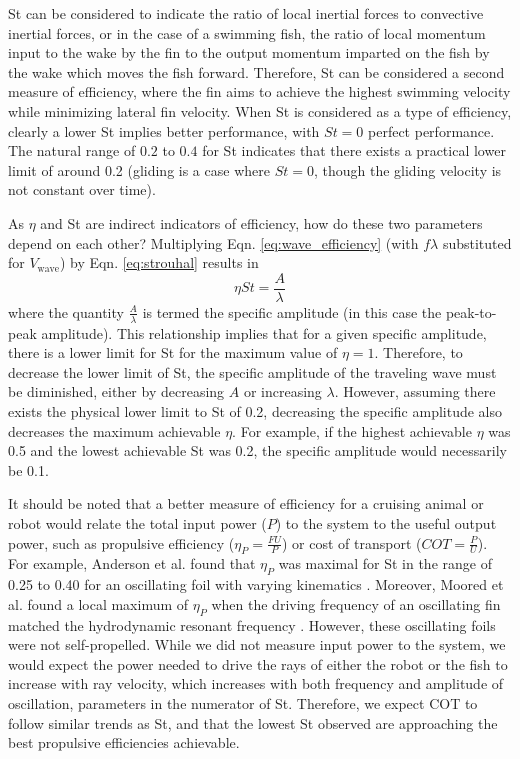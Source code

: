 \documentclass[onecolumn]{IEEEtran}
\begin{document}
St can be considered to indicate the ratio of local inertial forces to
convective inertial forces, or in the case of a swimming fish, the ratio
of local momentum input to the wake by the fin to the output momentum
imparted on the fish by the wake which moves the fish forward. Therefore,
St can be considered a second measure of efficiency, where the fin aims to
achieve the highest swimming velocity while minimizing lateral
fin velocity. When St is considered as a type of efficiency, clearly a
lower St implies better performance, with $St = 0$ perfect performance.
The natural range of $0.2$ to $0.4$ for St indicates that there exists a
practical lower limit of around 0.2 (gliding is a case where $St = 0$,
though the gliding velocity is not constant over time).

As $\eta$ and St are indirect indicators of efficiency, how
do these two parameters depend on each other? Multiplying Eqn.
\ref{eq:wave_efficiency} (with $f \lambda$ substituted for $V_\text{wave}$) by
Eqn. \ref{eq:strouhal} results in
\begin{equation} \eta St = \frac{A}{\lambda} \label{eq:specific_amp}
\end{equation}
where the quantity $\frac{A}{\lambda}$ is termed the specific amplitude (in this case the peak-to-peak amplitude).
This relationship implies that for a given specific
amplitude, there is a lower limit for St for the maximum value of $\eta =
1$. Therefore, to decrease the lower limit of St, the specific amplitude
of the traveling wave must be diminished, either by decreasing $A$ or
increasing $\lambda$. However, assuming there exists the physical lower
limit to St of 0.2, decreasing the specific amplitude also decreases the
maximum achievable $\eta$. For example, if the highest achievable $\eta$
was 0.5 and the lowest achievable St was 0.2, the specific amplitude would
necessarily be 0.1.


It should be noted that a better measure of efficiency for a cruising
animal or robot would relate the total input power ($P$) to the system to
the useful output power, such as propulsive efficiency ($\eta_P
=\frac{FU}{P}$) or cost of transport ($COT = \frac{P}{U}$). For example,
Anderson et al. found that $\eta_P$ was maximal for St in the range of
0.25 to 0.40 for an oscillating foil with varying kinematics
\citep*{Ande98a}. Moreover, Moored et al. found a local maximum of $\eta_P$
when the driving frequency of an oscillating fin matched the hydrodynamic
resonant frequency \citep{Moor12a}. However, these oscillating foils were
not self-propelled. While we did not measure input power to the system, we
would expect the power needed to drive the rays of either the robot or the
fish to increase with ray velocity, which increases with both frequency
and amplitude of oscillation, parameters in the numerator of St.
Therefore, we expect COT to follow similar trends as St, and that the
lowest St observed are approaching the best propulsive efficiencies
achievable.
\end{document}
